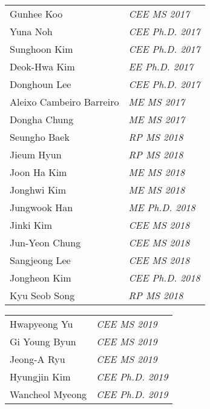 \begin{tabular}{ @{} l @{\hspace{10ex}} >{\itshape}l }
  Gunhee Koo	    & \ac{CEE}	MS	2017\\
  Yuna Noh	      & \ac{CEE}	Ph.D.	2017\\
  Sunghoon Kim	  & \ac{CEE}	Ph.D.	2017\\
  Deok-Hwa Kim	  & \ac{EE}	Ph.D.	2017\\
  Donghoun Lee	  & \ac{CEE}	Ph.D.	2017\\
  Aleixo Cambeiro Barreiro	& \ac{ME}	MS	2017\\
  Dongha Chung	  & \ac{ME}	MS	2017\\
  Seungho Baek	  & \ac{RP}	MS	2018\\
  Jieum Hyun	    & \ac{RP}	MS	2018\\
  Joon Ha Kim	    & \ac{ME}	MS	2018\\
  Jonghwi Kim	    & \ac{ME}	MS	2018\\
  Jungwook Han	  & \ac{ME}	Ph.D.	2018\\
  Jinki Kim	      & \ac{CEE}	MS	2018\\
  Jun-Yeon Chung	& \ac{CEE}	MS	2018\\
  Sangjeong Lee	  & \ac{CEE}	MS	2018\\
  Jongheon Kim	  & \ac{CEE}	Ph.D.	2018\\
  Kyu Seob Song	  & \ac{RP}	MS	2018\\
\end{tabular}

\begin{tabular}{ @{} l @{\hspace{10ex}} >{\itshape}l }
  Hwapyeong Yu	  & \ac{CEE}	MS	2019\\
  Gi Young Byun	  & \ac{CEE}	MS	2019\\
  Jeong-A Ryu	    & \ac{CEE}	MS	2019\\
  Hyungjin Kim    &	\ac{CEE}	Ph.D.	2019\\
  Wancheol Myeong	& \ac{CEE}	Ph.D.	2019\\
\end{tabular}

\vspace{5mm}
